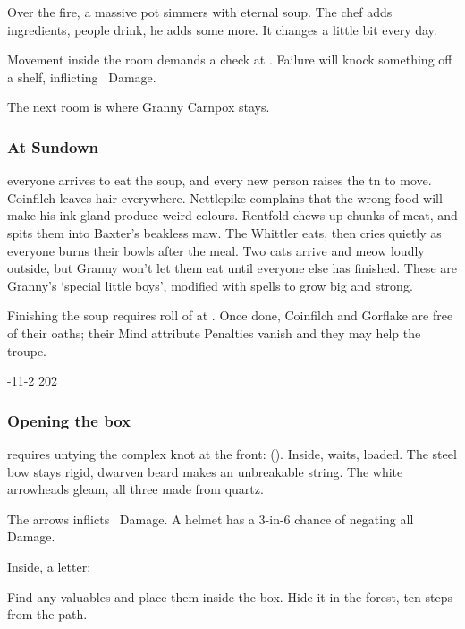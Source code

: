 \documentclass[10pt,twoside]{book}
\begin{document}
Over the fire, a massive pot simmers with eternal soup.
The chef adds ingredients, people drink, he adds some more.
It changes a little bit every day.

Movement inside the room demands a  check at \tn[8].
Failure will knock something off a shelf, inflicting ~Damage.

The next room is where Granny Carnpox stays.

\subsubsection{At Sundown}
everyone arrives to eat the soup, and every new person raises the \gls{tn} to move.
Coinfilch leaves hair everywhere.
Nettlepike complains that the wrong food will make his ink-gland produce weird colours.
Rentfold chews up chunks of meat, and spits them into Baxter's beakless maw.
The Whittler eats, then cries quietly as everyone burns their bowls after the meal.
Two cats arrive and meow loudly outside, but Granny won't let them eat until everyone else has finished.
These are Granny's `special little boys', modified with \glspl{spell} to grow big and strong.


Finishing the soup requires  roll of  at \tn[10].
Once done, Coinfilch and Gorflake are free of their oaths; their Mind \gls{attribute} Penalties vanish and they may help the troupe.

%
  {{-1}{1}{-2}}%
  {{2}{0}{2}}%
  {%
    \Dagger
  }%
  {}%
  {}%
  {}%

\setcounter{diceNo}{0}
\showStdSpells

\subsubsection{Opening the box}\label{insideTheBox}
requires untying the complex knot at the front:  (\tn[10]).
Inside,  waits, loaded.
The steel bow stays rigid, dwarven beard makes an unbreakable string.
The white arrowheads gleam, all three made from quartz.

The arrows inflicts ~Damage.
A helmet has a 3-in-6 chance of negating all Damage.

Inside, a letter:

\begin{speechtext}
  Find any valuables and place them inside the box.
  Hide it in the forest, ten steps from the path.
\end{speechtext}
\end{document}
